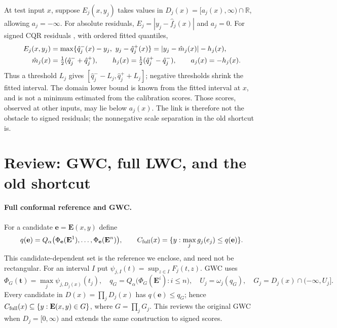 At test input $x$, suppose $E_j(x,y_j)$ takes values in
$D_j(x)=[a_j(x),\infty)\cap\mathbb R$, allowing $a_j=-\infty$.
For absolute residuals, $E_j=|y_j-\hat f_j(x)|$ and $a_j=0$.
For signed CQR residuals \cite{romano2019}, with ordered fitted quantiles,
\begin{align}\label{mt:cqr}
 E_j(x,y_j)&=\max\{\hat q_j^-(x)-y_j,\ y_j-\hat q_j^+(x)\}
             =|y_j-\hat m_j(x)|-h_j(x),\notag\\
 \hat m_j(x)&=\tfrac12(\hat q_j^-+\hat q_j^+),\qquad
 h_j(x)=\tfrac12(\hat q_j^+-\hat q_j^-),\qquad a_j(x)=-h_j(x).
\end{align}
Thus a threshold $L_j$ gives $[\hat q_j^- - L_j,\hat q_j^+ + L_j]$;
negative thresholds shrink the fitted interval. The domain lower bound is
known from the fitted interval at $x$, and is not a minimum estimated from
the calibration scores. Those scores, observed at other inputs, may lie below
$a_j(x)$. The link is therefore not the obstacle to signed residuals; the
nonnegative scale separation in the old shortcut is.

\section{Review: GWC, full LWC, and the old shortcut}
\paragraph{Full conformal reference and GWC.}
For a candidate $\mathbf e=\mathbf E(x,y)$ define
\[
 q(\mathbf e)=Q_\alpha\bigl(\Phi_{\mathbf e}(\mathbf E^1),\ldots,
                                  \Phi_{\mathbf e}(\mathbf E^n)\bigr),\qquad
 C_{\rm full}(x)=\{y:\max_jg_j(e_j)\le q(\mathbf e)\}.
\]
This candidate-dependent set is the reference we enclose, and need not be
rectangular. For an interval $I$ put
$\psi_{j,I}(t)=\sup_{z\in I}F_j(t,z)$. GWC uses
\begin{equation}\label{mt:gwc}
 \Phi_G(\mathbf t)=\max_j\psi_{j,D_j(x)}(t_j),\quad
 q_G=Q_\alpha\bigl(\Phi_G(\mathbf E^i):i\le n\bigr),\quad
 U_j=\omega_j(q_G),\quad G_j=D_j(x)\cap(-\infty,U_j].
\end{equation}
Every candidate in $D(x)=\prod_jD_j(x)$ has $q(\mathbf e)\le q_G$;
hence $C_{\rm full}(x)\subseteq\{y:\mathbf E(x,y)\in G\}$, where
$G=\prod_jG_j$. This reviews the original GWC when $D_j=[0,\infty)$
and extends the same construction to signed scores.


